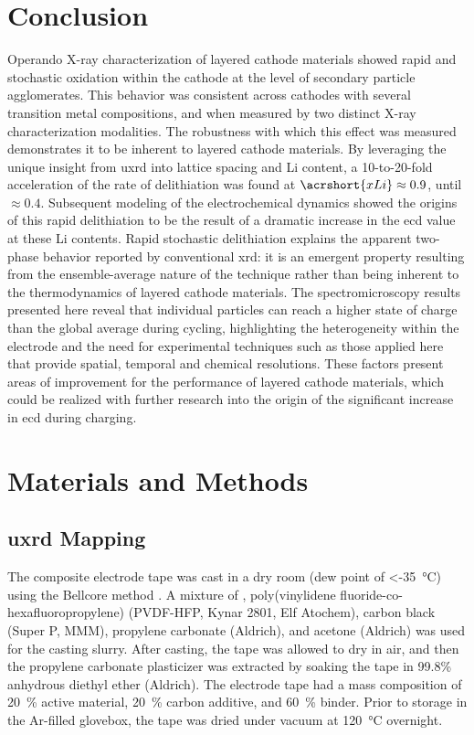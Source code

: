 \documentclass{WileyMSP-template}
\begin{document}
\section{Conclusion}

Operando X-ray characterization of layered cathode materials showed
rapid and stochastic oxidation within the cathode at the level of
secondary particle agglomerates. This behavior was consistent across
cathodes with several transition metal compositions, and when measured
by two distinct X-ray characterization modalities. The robustness with
which this effect was measured demonstrates it to be inherent to
layered cathode materials. By leveraging the unique insight from
\gls{uxrd} into lattice spacing and Li content, a 10-to-20-fold
acceleration of the rate of delithiation was found at $\acrshort{xLi}
\approx 0.9$, until $\approx 0.4$. Subsequent modeling of the
electrochemical dynamics showed the origins of this rapid delithiation
to be the result of a dramatic increase in the \gls{ecd} value at
these Li contents. Rapid stochastic delithiation explains the apparent
two-phase behavior reported by conventional \gls{xrd}: it is an
emergent property resulting from the ensemble-average nature of the
technique rather than being inherent to the thermodynamics of layered
cathode materials. The spectromicroscopy results presented here reveal
that individual particles can reach a higher state of charge than the
global average during cycling, highlighting the heterogeneity within
the electrode and the need for experimental techniques such as those
applied here that provide spatial, temporal and chemical
resolutions. These factors present areas of improvement for the
performance of layered cathode materials, which could be realized with
further research into the origin of the significant increase in
\gls{ecd} during charging.

\section*{Materials and Methods}
\label{sec:methods}

\subsection*{\gls{uxrd} Mapping}

The \nca{} composite electrode tape was cast in a dry room (dew point
of \SI{<-35}{\celsius}) using the Bellcore method \cite{warren1996}. A
mixture of \nca{}, poly(vinylidene fluoride-co-hexafluoropropylene)
(PVDF-HFP, Kynar 2801, Elf Atochem), carbon black (Super P, MMM),
propylene carbonate (Aldrich), and acetone (Aldrich) was used for the
casting slurry. After casting, the tape was allowed to dry in air, and
then the propylene carbonate plasticizer was extracted by soaking the
tape in 99.8\% anhydrous diethyl ether (Aldrich). The electrode tape
had a mass composition of \SI{20}{\percent} active material,
\SI{20}{\percent} carbon additive, and \SI{60}{\percent} binder. Prior
to storage in the Ar-filled glovebox, the tape was dried under vacuum
at \SI{120}{\celsius} overnight.
\end{document}
